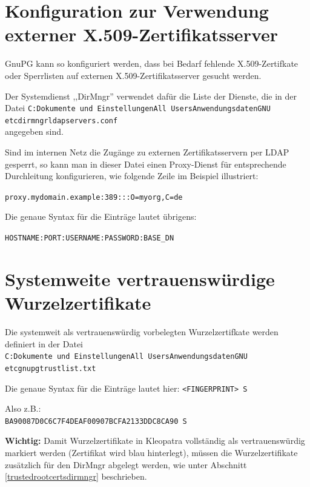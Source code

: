 \documentclass[a4paper,11pt, oneside,openright,titlepage,dvips]{scrbook}
\newcommand{\Filename}[1]{\texttt{#1}}
\newcommand\margin[1]{\marginline {\sffamily\scriptsize #1}}
\newcommand{\IncludeImage}[2][]{\texorhtml{%
\texttt{[image: \#2]}%
}{%
\htmlimg{#2.png}%
}}
\newcounter{chapter}
\newcounter{section}[chapter]
\begin{document}
\section{Konfiguration zur Verwendung externer X.509-Zertifikatsserver \label{ldapservers}}
\T\margin{\IncludeImage[width=1.5cm]{smime-icon}}

GnuPG kann so konfiguriert werden, dass bei Bedarf fehlende X.509-Zertifkate
oder Sperrlisten auf externen X.509-Zertifikatsserver gesucht werden.

Der Systemdienst ,,DirMngr'' verwendet dafür die Liste der Dienste, die
in der Datei\newline
\Filename{C:\back{}Dokumente und Einstellungen\back{}All
Users\back{}Anwendungsdaten\back{}GNU\back{}\T\\
etc\back{}dirmngr\back{}ldapservers.conf}\\
angegeben sind.

Sind im internen Netz die Zugänge zu externen Zertifikatsservern per LDAP gesperrt, so
kann man in dieser Datei einen Proxy-Dienst für entsprechende Durchleitung
konfigurieren, wie folgende Zeile im Beispiel illustriert:

\verb#proxy.mydomain.example:389:::O=myorg,C=de#

Die genaue Syntax für die Einträge lautet übrigens:

\verb#HOSTNAME:PORT:USERNAME:PASSWORD:BASE_DN#

\clearpage
\section{Systemweite vertrauenswürdige Wurzelzertifikate}
\label{sec_systemtrustedrootcerts}
\T\margin{\IncludeImage[width=1.5cm]{smime-icon}}

Die systemweit als vertrauenswürdig vorbelegten Wurzelzertifkate
werden definiert in der Datei\\
\Filename{C:\back{}Dokumente und Einstellungen\back{}All
Users\back{}Anwendungsdaten\back{}GNU\back{}\T\\
etc\back{}gnupg\back{}trustlist.txt}

Die genaue Syntax für die Einträge lautet hier:
\verb#<FINGERPRINT> S#

Also z.B.:\\
\verb+BA90087D0C6C7F4DEAF00907BCFA2133DDC8CA90 S+

\textbf{Wichtig:} Damit Wurzelzertifikate in Kleopatra vollständig als
vertrauenswürdig markiert werden (Zertifikat wird blau hinterlegt),
müssen die Wurzelzertifikate zusätzlich für den DirMngr abgelegt
werden, wie unter Abschnitt \ref{trustedrootcertsdirmngr}
beschrieben.
\end{document}
